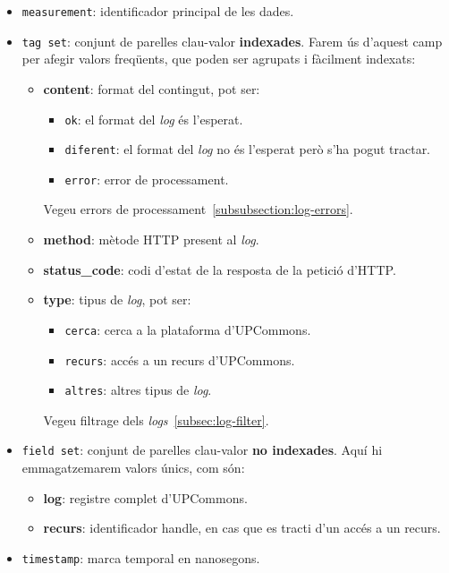 \begin{itemize}
    \item \texttt{measurement}: identificador principal de les dades.
    \item \texttt{tag set}: conjunt de parelles clau-valor \textbf{indexades}.
    Farem ús d'aquest camp per afegir valors freqüents, que poden ser agrupats i fàcilment indexats:
    \begin{itemize}
        \item \textbf{content}: format del contingut, pot ser:
        \begin{itemize}
            \item \texttt{ok}: el format del \textit{\gls{log}} és l'esperat.
            \item \texttt{diferent}: el format del \textit{\gls{log}} no és l'esperat però s'ha pogut tractar.
            \item \texttt{error}: error de processament.
        \end{itemize}
        Vegeu errors de processament~\ref{subsubsection:log-errors}.
        \item \textbf{method}: mètode \gls{HTTP} present al \textit{\gls{log}}.
        \item \textbf{status\_code}: codi d'estat de la resposta de la petició d'\gls{HTTP}.
        \item \textbf{type}: tipus de \textit{\gls{log}}, pot ser:
        \begin{itemize}
            \item \texttt{cerca}: cerca a la plataforma d'\gls{UPCommons}.
            \item \texttt{recurs}: accés a un recurs d'\gls{UPCommons}.
            \item \texttt{altres}: altres tipus de \textit{\gls{log}}.
        \end{itemize}
        Vegeu filtrage dels \textit{\gls{log}s}~\ref{subsec:log-filter}.
    \end{itemize}
    \item \texttt{field set}: conjunt de parelles clau-valor \textbf{no indexades}.
    Aquí hi emmagatzemarem valors únics, com són:
    \begin{itemize}
        \item \textbf{log}: registre complet d'\gls{UPCommons}.
        \item \textbf{recurs}: identificador \gls{handle}, en cas que es tracti d'un accés a un recurs.
    \end{itemize}
    \item \texttt{\gls{timestamp}}: marca temporal en nanosegons.
\end{itemize}

